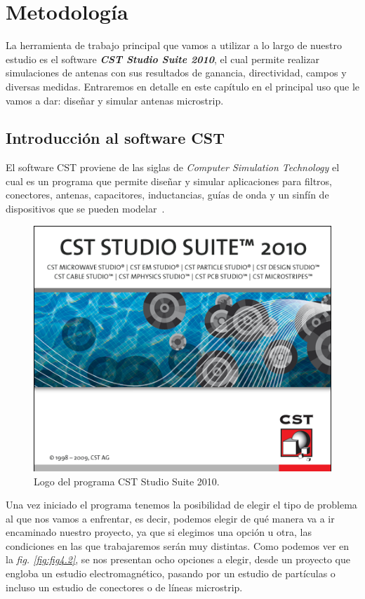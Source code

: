 \chapter{\textbf{Metodología}}\label{ch:metodos}

La herramienta de trabajo principal que vamos a utilizar a lo largo de nuestro estudio es el software \textbf{\textit{CST Studio Suite 2010}}, el cual permite realizar simulaciones de antenas con sus resultados de ganancia, directividad, campos y diversas medidas. Entraremos en detalle en este capítulo en el principal uso que le vamos a dar: diseñar y simular antenas microstrip.


\section{Introducción al software CST}

El software CST proviene de las siglas de \textit{Computer Simulation Technology} el cual es un programa que permite diseñar y simular aplicaciones para filtros, conectores, antenas, capacitores, inductancias, guías de onda y un sinfín de dispositivos que se pueden modelar~\cite{cst}.

\begin{figure}[!htb]
    \centering
    \includegraphics[scale=0.35]{./Metodologia/CST_Intro}
    \caption{Logo del programa CST Studio Suite 2010.}
    \label{fig:fig4.1}
\end{figure}

Una vez iniciado el programa tenemos la posibilidad de elegir el tipo de problema al que nos vamos a enfrentar, es decir, podemos elegir de qué manera va a ir encaminado nuestro proyecto, ya que si elegimos una opción u otra, las condiciones en las que trabajaremos serán muy distintas. Como podemos ver en la \textit{fig. \ref{fig:fig4.2}}, se nos presentan ocho opciones a elegir, desde un proyecto que engloba un estudio electromagnético, pasando por un estudio de partículas o incluso un estudio de conectores o de líneas microstrip.

